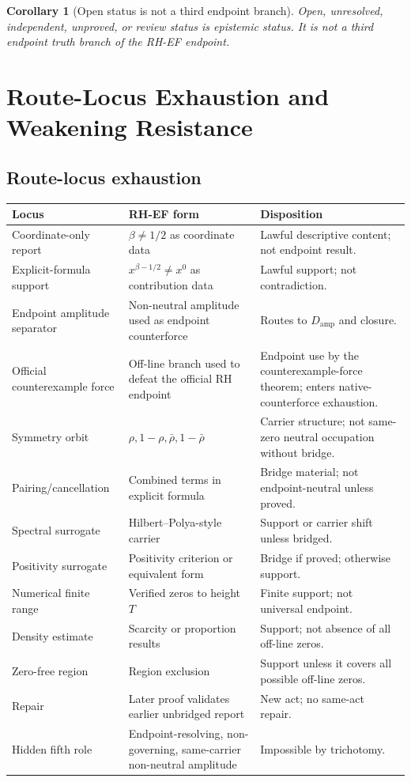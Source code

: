 \documentclass[11pt]{article}
\newtheorem{corollary}{Corollary}[section]
\newcommand{\Damp}{D_{\mathrm{amp}}}
\begin{document}
\begin{corollary}[Open status is not a third endpoint branch]
Open, unresolved, independent, unproved, or review status is epistemic status.  It is not a third endpoint truth branch of the RH-EF endpoint.
\end{corollary}

\section{Route-Locus Exhaustion and Weakening Resistance}

\subsection{Route-locus exhaustion}

\begin{longtable}{L{0.21\textwidth}L{0.43\textwidth}L{0.27\textwidth}}
\toprule
\textbf{Locus} & \textbf{RH-EF form} & \textbf{Disposition}\\
\midrule
Coordinate-only report & \(\beta\ne 1/2\) as coordinate data & Lawful descriptive content; not endpoint result.\\
Explicit-formula support & \(x^{\beta-1/2}\ne x^0\) as contribution data & Lawful support; not contradiction.\\
Endpoint amplitude separator & Non-neutral amplitude used as endpoint counterforce & Routes to \(\Damp\) and closure.\\
Official counterexample force & Off-line branch used to defeat the official RH endpoint & Endpoint use by the counterexample-force theorem; enters native-counterforce exhaustion.\\
Symmetry orbit & \(\rho,1-\rho,\bar\rho,1-\bar\rho\) & Carrier structure; not same-zero neutral occupation without bridge.\\
Pairing/cancellation & Combined terms in explicit formula & Bridge material; not endpoint-neutral unless proved.\\
Spectral surrogate & Hilbert--Polya-style carrier & Support or carrier shift unless bridged.\\
Positivity surrogate & Positivity criterion or equivalent form & Bridge if proved; otherwise support.\\
Numerical finite range & Verified zeros to height \(T\) & Finite support; not universal endpoint.\\
Density estimate & Scarcity or proportion results & Support; not absence of all off-line zeros.\\
Zero-free region & Region exclusion & Support unless it covers all possible off-line zeros.\\
Repair & Later proof validates earlier unbridged report & New act; no same-act repair.\\
Hidden fifth role & Endpoint-resolving, non-governing, same-carrier non-neutral amplitude & Impossible by trichotomy.\\
\bottomrule
\end{longtable}
\end{document}
